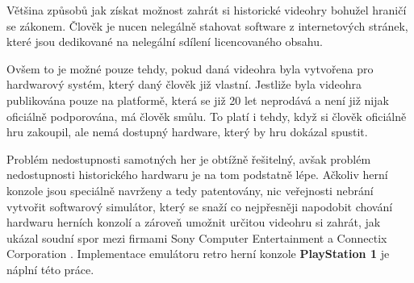 Většina způsobů jak získat možnost zahrát si historické videohry bohužel hraničí
se zákonem. Člověk je nucen nelegálně stahovat software z internetových stránek,
které jsou dedikované na nelegální sdílení licencovaného obsahu.

Ovšem to je možné pouze tehdy, pokud daná videohra byla vytvořena pro hardwarový systém,
který daný člověk již vlastní. Jestliže byla videohra publikována pouze na platformě,
která se již 20 let neprodává a není již nijak oficiálně podporována, má člověk smůlu.
To platí i tehdy, když si člověk oficiálně hru zakoupil, ale nemá dostupný hardware, který by hru
dokázal spustit.

Problém nedostupnosti samotných her je obtížně řešitelný, avšak problém nedostupnosti
historického hardwaru je na tom podstatně lépe. Ačkoliv herní konzole jsou
speciálně navrženy a tedy patentovány, nic veřejnosti nebrání vytvořit softwarový simulátor,
který se snaží co nejpřesněji napodobit chování hardwaru herních konzolí a
zároveň umožnit určitou videohru si zahrát, jak ukázal soudní spor mezi
firmami Sony Computer Entertainment a Connectix Corporation \cite{SonyVsConnectix}.
Implementace emulátoru retro herní konzole \textbf{PlayStation 1} je náplní této práce.
